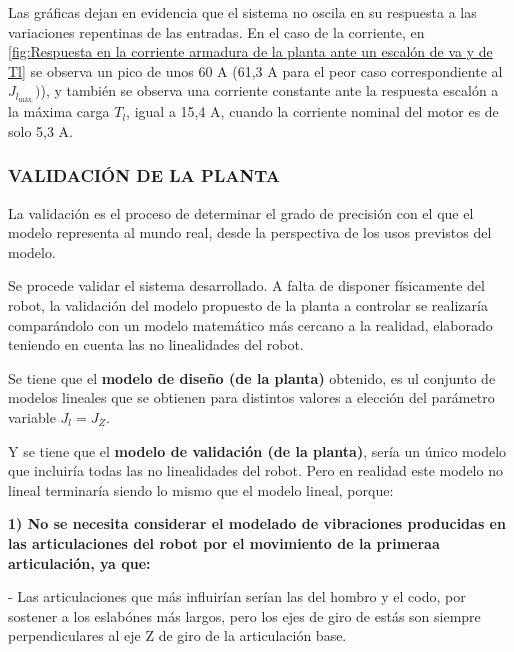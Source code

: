 \documentclass{article}
\begin{document}
\begin{sloppypar}
Las gráficas dejan en evidencia que el sistema no oscila en su respuesta a las variaciones repentinas de las entradas.
En el caso de la corriente, en \ref{fig:Respuesta en la corriente armadura de la planta ante un escalón de va y de Tl} se observa un pico de unos 60 A (61,3 A para el peor caso correspondiente al $J_{l_{\text{máx.}}})$), y también se observa una corriente constante ante la respuesta escalón a la máxima carga $T_l$, igual a 15,4 A, cuando la corriente nominal del motor es de solo 5,3 A.

\subsubsection{VALIDACIÓN DE LA PLANTA}
\label{sec:VALIDACIÓN DE LA PLANTA}

La validación es el proceso de determinar el grado de precisión con el que el modelo representa al mundo real, desde la perspectiva de los usos previstos del modelo.

Se procede validar el sistema desarrollado. A falta de disponer físicamente del robot, la validación del modelo propuesto de la planta a controlar se realizaría comparándolo con un modelo matemático más cercano a la realidad, elaborado teniendo en cuenta las no linealidades del robot.

Se tiene que el \textbf{modelo de diseño (de la planta)} obtenido, es ul conjunto de modelos lineales que se obtienen para distintos valores a elección del parámetro variable $J_l=J_Z$.

Y se tiene que el \textbf{modelo de validación (de la planta)}, sería un único modelo que incluiría todas las no linealidades del robot. Pero en realidad este modelo no lineal terminaría siendo lo mismo que el modelo lineal, porque:

\textbf{1) No se necesita considerar el modelado de vibraciones producidas en las articulaciones del robot por el movimiento de la primeraa articulación, ya que:}

- Las articulaciones que más influirían serían las del hombro y el codo, por sostener a los eslabónes más largos, pero los ejes de giro de estás son siempre perpendiculares al eje Z de giro de la articulación base.


\end{sloppypar}
\end{document}
